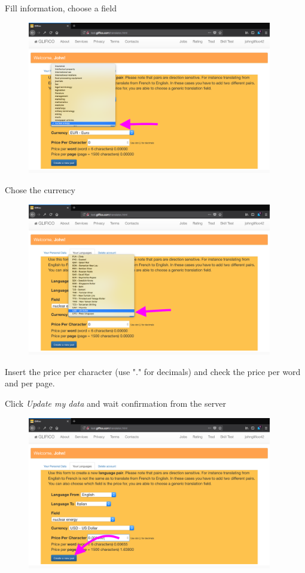 \documentclass[11 pt, a4paper]{article}
\begin{document}
\clearpage
Fill information, choose a field 
\begin{figure}[H]
\centering
\includegraphics[width=0.95\textwidth]{translator_pair2.png}
\end{figure}

Chose the currency
\begin{figure}[H]
\centering
\includegraphics[width=0.95\textwidth]{translator_pair3.png}
\end{figure}

Insert the price per character (use "." for decimals) and check the price per word and per page.


\clearpage
Click \textit{Update my data} and wait confirmation from the server
\begin{figure}[H]
\centering
\includegraphics[width=0.95\textwidth]{translator_pair4.png}
\end{figure}
\end{document}

